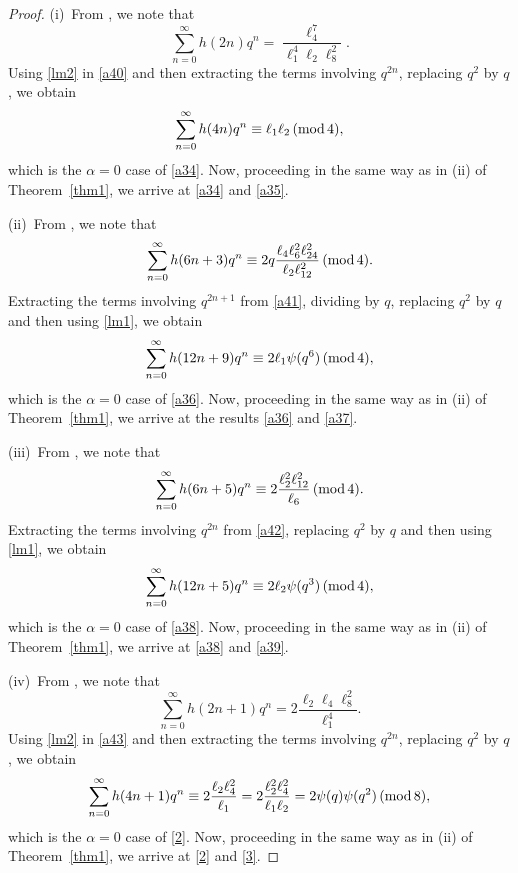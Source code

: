 \documentclass[12pt]{article}
\renewcommand{\(}{\left\(}
\renewcommand{\)}{\right\)}
\renewcommand{\[}{\left[}
\renewcommand{\]}{\right]}
\renewcommand{\pmod}[1]{\,(\textup{mod}\,#1)}
\numberwithin{equation}{section}
\theoremstyle{plain}
\begin{document}
\begin{proof}
(i)~From \cite[p. 10 Theorem 5]{GM1}, we note that
\begin{equation}\label{a40}
\sum_{n=0}^{\infty}h(2n)q^n=\dfrac{\ell_4^7}{\ell_1^4\ell_2\ell_8^2}.
\end{equation}Using \eqref{lm2} in \eqref{a40} and then extracting the terms involving $q^{2n}$, replacing $q^2$ by $q$, we obtain
$$\sum_{n=0}^{\infty}h(4n)q^n\equiv\ell_1\ell_2\pmod{4},$$which is the $\alpha=0$ case of \eqref{a34}. Now, proceeding in the same way as in (ii) of Theorem~\ref{thm1}, we arrive at \eqref{a34} and \eqref{a35}.

(ii)~From \cite[p. 11 Theorem 5]{GM1}, we note that
\begin{equation}\label{a41}
\sum_{n=0}^{\infty}h(6n+3)q^n\equiv 2q\dfrac{\ell_4\ell_6^2\ell_{24}^2}{\ell_2\ell_{12}^2}\pmod{4}.
\end{equation}Extracting the terms involving $q^{2n+1}$ from \eqref{a41}, dividing by $q$, replacing $q^2$ by $q$ and then using \eqref{lm1}, we obtain
$$\sum_{n=0}^{\infty}h(12n+9)q^n\equiv2\ell_1\psi(q^6)\pmod{4},$$which is the $\alpha=0$ case of \eqref{a36}. Now, proceeding in the same way as in (ii) of Theorem~\ref{thm1}, we arrive at the results \eqref{a36} and \eqref{a37}.

(iii)~From \cite[p. 11 Theorem 5]{GM1}, we note that
\begin{equation}\label{a42}
\sum_{n=0}^{\infty}h(6n+5)q^n\equiv 2\dfrac{\ell_2^2\ell_{12}^2}{\ell_6}\pmod{4}.
\end{equation}Extracting the terms involving $q^{2n}$ from \eqref{a42}, replacing $q^2$ by $q$ and then using \eqref{lm1}, we obtain
$$\sum_{n=0}^{\infty}h(12n+5)q^n\equiv 2\ell_2\psi(q^3)\pmod{4},$$which is the $\alpha=0$ case of \eqref{a38}. Now, proceeding in the same way as in (ii) of Theorem~\ref{thm1}, we arrive at \eqref{a38} and \eqref{a39}.

(iv)~From \cite[p. 10 Theorem 5]{GM1}, we note that
\begin{equation}\label{a43}
\sum_{n=0}^{\infty}h(2n+1)q^n=2\dfrac{\ell_2\ell_4\ell_8^2}{\ell_1^4}.
\end{equation}Using \eqref{lm2} in \eqref{a43} and then extracting the terms involving $q^{2n}$, replacing $q^2$ by $q$, we obtain
$$\sum_{n=0}^{\infty}h(4n+1)q^n\equiv 2\dfrac{\ell_2\ell_4^2}{\ell_1}=2\dfrac{\ell_2^2\ell_4^2}{\ell_1\ell_2}=2\psi(q)\psi(q^2)\pmod{8},$$ which is the $\alpha=0$ case of \eqref{2}. Now, proceeding in the same way as in (ii) of Theorem~\ref{thm1}, we arrive at \eqref{2} and \eqref{3}.
\end{proof}
\end{document}
